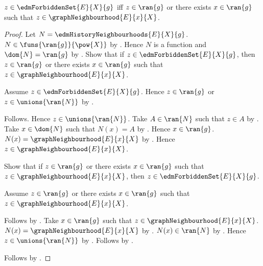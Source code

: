 \begin{proposition}\label{edm_forbidden_set_iff}
    $z\in\edmForbiddenSet{E}{X}{g}$ iff
        $z\in\ran{g}$ or there exists $x\in\ran{g}$ such that
            $z\in\graphNeighbourhood{E}{x}{X}$.
\end{proposition}
\begin{proof}
    Let $N=\edmHistoryNeighbourhoods{E}{X}{g}$.
    $N\in\funs{\ran{g}}{\pow{X}}$ by
        .
    Hence $N$ is a function and $\dom{N}=\ran{g}$ by
        .
    Show that if $z\in\edmForbiddenSet{E}{X}{g}$, then
        $z\in\ran{g}$ or there exists $x\in\ran{g}$ such that
            $z\in\graphNeighbourhood{E}{x}{X}$.
    \begin{subproof}
        Assume $z\in\edmForbiddenSet{E}{X}{g}$.
        Hence $z\in\ran{g}$ or
            $z\in\unions{\ran{N}}$ by
            .
        \begin{byCase}
                Follows.
                Hence $z\in\unions{\ran{N}}$.
                Take $A\in\ran{N}$ such that $z\in A$ by
                    .
                Take $x\in\dom{N}$ such that $N(x)=A$ by
                    .
                Hence $x\in\ran{g}$.
                $N(x)=\graphNeighbourhood{E}{x}{X}$ by
                    .
                Hence $z\in\graphNeighbourhood{E}{x}{X}$.
        \end{byCase}
    \end{subproof}
    Show that if $z\in\ran{g}$ or there exists $x\in\ran{g}$ such that
            $z\in\graphNeighbourhood{E}{x}{X}$, then
        $z\in\edmForbiddenSet{E}{X}{g}$.
    \begin{subproof}
        Assume $z\in\ran{g}$ or there exists $x\in\ran{g}$ such that
            $z\in\graphNeighbourhood{E}{x}{X}$.
        \begin{byCase}
                Follows by .
                Take $x\in\ran{g}$ such that
                    $z\in\graphNeighbourhood{E}{x}{X}$.
                $N(x)=\graphNeighbourhood{E}{x}{X}$ by
                    .
                $N(x)\in\ran{N}$ by .
                Hence $z\in\unions{\ran{N}}$ by .
                Follows by .
        \end{byCase}
    \end{subproof}
    Follows by \auto.
\end{proof}

